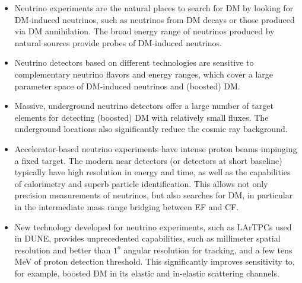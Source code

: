 \documentclass[nofootinbib]{article}
\begin{document}
\vspace{1em}
\begin{itemize}
\item Neutrino experiments are the natural places to search for DM by looking for DM-induced neutrinos, such as neutrinos from DM decays or those produced via DM annihilation. The broad energy range of neutrinos produced by natural sources provide probes of DM-induced neutrinos.
\item Neutrino detectors based on different technologies are sensitive to complementary neutrino flavors and energy ranges, which cover a large parameter space of DM-induced neutrinos and (boosted) DM.
\item Massive, underground neutrino detectors offer a large number of target elements for detecting (boosted) DM with relatively small fluxes. The underground locations also significantly reduce the cosmic ray background.
\item Accelerator-based neutrino experiments have intense proton beams impinging a fixed target. The modern near detectors (or detectors at short baseline) typically have high resolution in energy and time, as well as the capabilities of calorimetry and superb particle identification. This allows not only precision measurements of neutrinos, but also searches for DM, in particular in the intermediate mass range bridging between EF and CF.
\item New technology developed for neutrino experiments, such as LArTPCs used in DUNE, provides unprecedented capabilities, such as millimeter spatial resolution and better than $1^{o}$ angular resolution for tracking, and a few tens MeV of proton detection threshold. This significantly improves sensitivity to, for example, boosted DM in its elastic and in-elastic scattering channels. 


\end{itemize}
\end{document}
